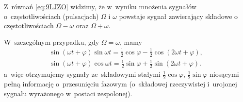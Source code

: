 \documentclass[paper=a4,DIV=12]{tfa}
\begin{document}
Z~równań \eqref{eq:9LJZO} widzimy, że w~wyniku mnożenia sygnałów
o~częstotliwościach (pulsacjach) $\Omega$ i $\omega$ powstaje sygnał
zawierający składowe o częstotliwościach $\Omega - \omega$ oraz $\Omega +
\omega$.

W~szczególnym przypadku, gdy $\Omega = \omega$, mamy
\begin{subequations}
  \label{eq:EE55O}
  \begin{align}
    &
    \sin \left(\omega t + \varphi\right) \sin\omega t
    =
    \frac{1}{2} \cos{\varphi} - \frac{1}{2} \cos{(2 \omega t + \varphi)},
    &
    \label{eq:U3M0L}
    \\
    &
    \sin \left(\omega t + \varphi\right) \cos \omega t
    =
    \frac{1}{2} \sin{\varphi} + \frac{1}{2} \sin{(2 \omega t + \varphi)}.
    &
    \label{eq:2ENFD}
  \end{align}
\end{subequations}
a~więc otrzymujemy sygnały ze~składowymi stałymi $\frac{1}{2}\cos\varphi$,
$\frac{1}{2}\sin\varphi$ niosącymi pełną informację o~przesunięciu fazowym
(o~składowej rzeczywistej i~urojonej sygnału wyrażonego w~postaci zespolonej).
\end{document}
